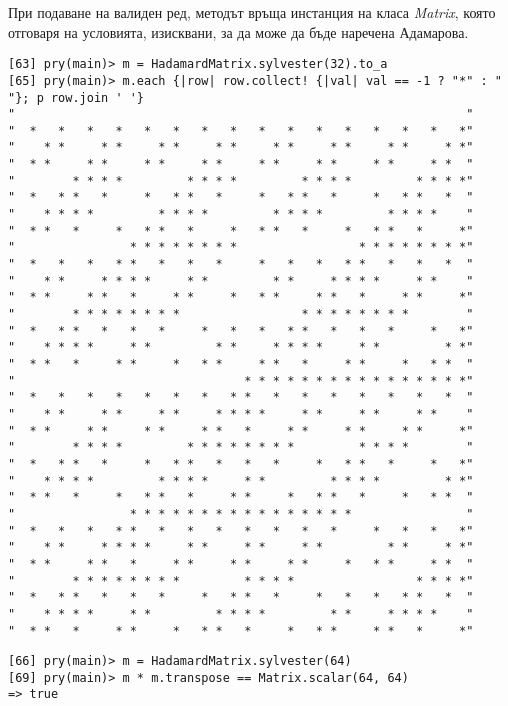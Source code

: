 \documentclass[a4paper,notitlepage,oneside]{report}
\begin{document}
При подаване на валиден ред, методът връща инстанция на класа \emph{Matrix},
която отговаря на условията, изисквани, за да може да бъде наречена Адамарова.
\begin{lstlisting}
[63] pry(main)> m = HadamardMatrix.sylvester(32).to_a
[65] pry(main)> m.each {|row| row.collect! {|val| val == -1 ? "*" : " "}; p row.join ' '}
"                                                               "
"  *   *   *   *   *   *   *   *   *   *   *   *   *   *   *   *"
"    * *     * *     * *     * *     * *     * *     * *     * *"
"  * *     * *     * *     * *     * *     * *     * *     * *  "
"        * * * *         * * * *         * * * *         * * * *"
"  *   * *   *     *   * *   *     *   * *   *     *   * *   *  "
"    * * * *         * * * *         * * * *         * * * *    "
"  * *   *     *   * *   *     *   * *   *     *   * *   *     *"
"                * * * * * * * *                 * * * * * * * *"
"  *   *   *   * *   *   *   *     *   *   *   * *   *   *   *  "
"    * *     * * * *     * *         * *     * * * *     * *    "
"  * *     * *   *     * *     *   * *     * *   *     * *     *"
"        * * * * * * * *                 * * * * * * * *        "
"  *   * *   *   *   *     *   *   *   * *   *   *   *     *   *"
"    * * * *     * *         * *     * * * *     * *         * *"
"  * *   *     * *     *   * *     * *   *     * *     *   * *  "
"                                * * * * * * * * * * * * * * * *"
"  *   *   *   *   *   *   *   * *   *   *   *   *   *   *   *  "
"    * *     * *     * *     * * * *     * *     * *     * *    "
"  * *     * *     * *     * *   *     * *     * *     * *     *"
"        * * * *         * * * * * * * *         * * * *        "
"  *   * *   *     *   * *   *   *   *     *   * *   *     *   *"
"    * * * *         * * * *     * *         * * * *         * *"
"  * *   *     *   * *   *     * *     *   * *   *     *   * *  "
"                * * * * * * * * * * * * * * * *                "
"  *   *   *   * *   *   *   *   *   *   *   *     *   *   *   *"
"    * *     * * * *     * *     * *     * *         * *     * *"
"  * *     * *   *     * *     * *     * *     *   * *     * *  "
"        * * * * * * * *         * * * *                 * * * *"
"  *   * *   *   *   *     *   * *   *     *   *   *   * *   *  "
"    * * * *     * *         * * * *         * *     * * * *    "
"  * *   *     * *     *   * *   *     *   * *     * *   *     *"
\end{lstlisting}

\begin{lstlisting}
[66] pry(main)> m = HadamardMatrix.sylvester(64)
[69] pry(main)> m * m.transpose == Matrix.scalar(64, 64)
=> true
\end{lstlisting}
\end{document}
